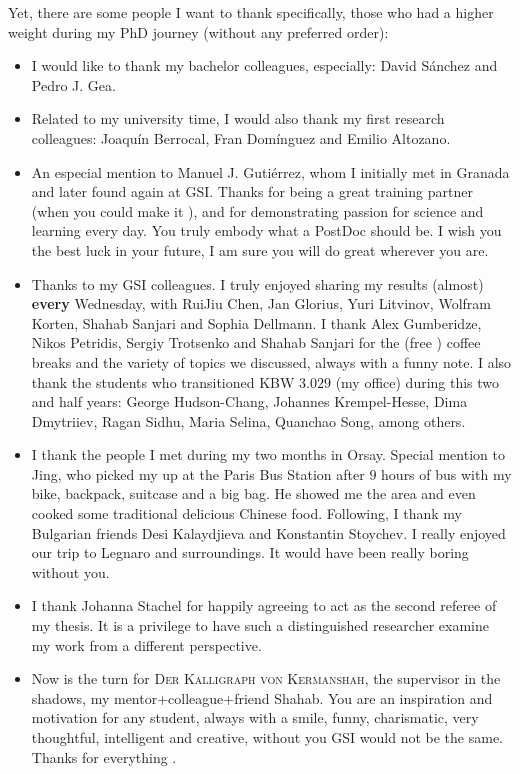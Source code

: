     Yet, there are some people I want to thank specifically, those who had a higher weight during my PhD journey (without any preferred order):
    \begin{itemize}
        \item I would like to thank my bachelor colleagues, especially: David Sánchez and Pedro J. Gea.
        \item Related to my university time, I would also thank my first research colleagues: Joaquín Berrocal, Fran Domínguez and Emilio Altozano.
        \item An especial mention to Manuel J. Gutiérrez, whom I initially met in Granada and later found again at \textsc{GSI}. Thanks for being a great training partner (when you could make it \faGrinWink[regular]), and for demonstrating passion for science and learning every day. You truly embody what a PostDoc should be. I wish you the best luck in your future, I am sure you will do great wherever you are.
        \item Thanks to my \textsc{GSI} colleagues. I truly enjoyed sharing my results (almost) \textbf{every} Wednesday, with RuiJiu Chen, Jan Glorius, Yuri Litvinov, Wolfram Korten, Shahab Sanjari and Sophia Dellmann. I thank Alex Gumberidze, Nikos Petridis, Sergiy Trotsenko and Shahab Sanjari for the (free \faGrinBeam[regular]) coffee breaks and the variety of topics we discussed, always with a funny note. I also thank the students who transitioned \textsc{KBW $3.029$} (my office) during this two and half years: George Hudson-Chang, Johannes Krempel-Hesse, Dima Dmytriiev, Ragan Sidhu, Maria Selina, Quanchao Song, among others.
        \item I thank the people I met during my two months in Orsay. Special mention to Jing, who picked my up at the Paris Bus Station after $9$ hours of bus with my bike, backpack, suitcase and a big bag. He showed me the area and even cooked some traditional delicious Chinese food. Following, I thank my Bulgarian friends Desi Kalaydjieva and Konstantin Stoychev. I really enjoyed our trip to Legnaro and surroundings. It would have been really boring without you.
        \item I thank Johanna Stachel for happily agreeing to act as the second referee of my thesis. It is a privilege to have such a distinguished researcher examine my work from a different perspective.
        \item Now is the turn for \textsc{Der Kalligraph von Kermanshah}, the supervisor in the shadows, my mentor+colleague+friend Shahab. You are an inspiration and motivation for any student, always with a smile, funny, charismatic, very thoughtful, intelligent and creative, without you \textsc{GSI} would not be the same. Thanks for everything \faGrinWink[regular]\faGrin*[regular].

\end{itemize}
